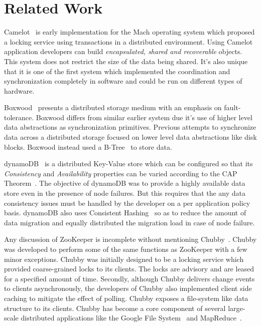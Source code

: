 \chapter{Related Work}
Camelot~\cite{hastings1990distributed} is early implementation for the Mach operating system which proposed a locking service using transactions in a distributed environment. Using Camelot application developers can build \textit{encapsulated, shared and recoverable} objects. This system does not restrict the size of the data being shared. It's also unique that it is one of the first system which implemented the coordination and synchronization completely in software and could be run on different types of hardware.

Boxwood~\cite{maccormick2004boxwood} presents a distributed storage medium with an emphasis on fault-tolerance. Boxwood differs from similar earlier system due it's use of higher level data abstractions as synchronization primitives. Previous attempts to synchronize data across a distributed storage focused on lower level data abstractions like disk blocks. Boxwood instead used a B-Tree~\cite{skiena504algorithm} to store data.

dynamoDB~\cite{decandia2007dynamo} is a distributed Key-Value store which can be configured so that its \textit{Consistency} and \textit{Availability} properties can be varied according to the CAP Theorem~\cite{Gilbert:2002:BCF:564585.564601}. The objective of dynamoDB was to provide a highly available data store even in the presence of node failures. But this requires that the any data consistency issues must be handled by the developer on a per application policy basis. dynamoDB also uses Consistent Hashing~\cite{Karger:1997:CHR:258533.258660} so as to reduce the amount of data migration and equally distributed the migration load in case of node failure. 

Any discussion of ZooKeeper is incomplete without mentioning Chubby~\cite{burrows2006chubby}. Chubby was developed to perform some of the same functions as ZooKeeper with a few minor exceptions. Chubby was initially designed to be a locking service which provided coarse-grained locks to its clients. The locks are advisory and are leased for a specified amount of time. Secondly, although Chubby delivers change events to clients asynchronously, the developers of Chubby also implemented client side caching to mitigate the effect of polling. Chubby exposes a file-system like data structure to its clients. Chubby has become a core component of several large-scale distributed applications like the Google File System~\cite{Ghemawat:2003:GFS:945445.945450} and MapReduce~\cite{Dean:2008:MSD:1327452.1327492}.

